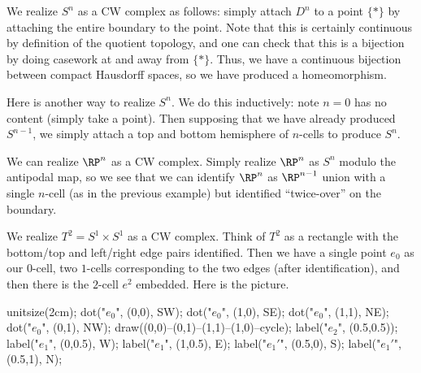 \documentclass[../notes.tex]{subfiles}
\begin{document}
\begin{example}
	We realize $S^n$ as a CW complex as follows: simply attach $D^n$ to a point $\{*\}$ by attaching the entire boundary to the point. Note that this is certainly continuous by definition of the quotient topology, and one can check that this is a bijection by doing casework at and away from $\{*\}$. Thus, we have a continuous bijection between compact Hausdorff spaces, so we have produced a homeomorphism.
\end{example}
\begin{example}
	Here is another way to realize $S^n$. We do this inductively: note $n=0$ has no content (simply take a point). Then supposing that we have already produced $S^{n-1}$, we simply attach a top and bottom hemisphere of $n$-cells to produce $S^n$.
\end{example}
\begin{example}
	We can realize $\RP^n$ as a CW complex. Simply realize $\RP^n$ as $S^n$ modulo the antipodal map, so we see that we can identify $\RP^n$ as $\RP^{n-1}$ union with a single $n$-cell (as in the previous example) but identified ``twice-over'' on the boundary.
\end{example}
\begin{example}
	We realize $T^2=S^1\times S^1$ as a CW complex. Think of $T^2$ as a rectangle with the bottom/top and left/right edge pairs identified. Then we have a single point $e_0$ as our $0$-cell, two $1$-cells corresponding to the two edges (after identification), and then there is the $2$-cell $e^2$ embedded. Here is the picture.
	\begin{center}
		\begin{asy}
			unitsize(2cm);
			dot("$e_0$", (0,0), SW);
			dot("$e_0$", (1,0), SE);
			dot("$e_0$", (1,1), NE);
			dot("$e_0$", (0,1), NW);
			draw((0,0)--(0,1)--(1,1)--(1,0)--cycle);
			label("$e_2$", (0.5,0.5));
			label("$e_1$", (0,0.5), W);
			label("$e_1$", (1,0.5), E);
			label("$e_1'$", (0.5,0), S);
			label("$e_1'$", (0.5,1), N);
		\end{asy}
	\end{center}
\end{example}
\end{document}
